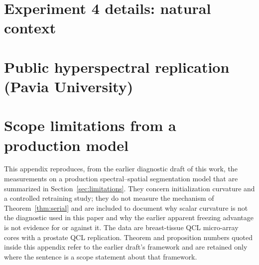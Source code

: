 \section{Experiment 4 details: natural context}
\label{app:exp4}

\section{Public hyperspectral replication (Pavia University)}
\label{app:pavia}

\section{Scope limitations from a production model}
\label{app:scope}

This appendix reproduces, from the earlier diagnostic draft of this work,
the measurements on a production spectral--spatial segmentation model that
are summarized in Section~\ref{sec:limitations}. They concern initialization
curvature and a controlled retraining study; they do not measure the
mechanism of Theorem~\ref{thm:serial} and are included to document why
scalar curvature is not the diagnostic used in this paper and why the
earlier apparent freezing advantage is not evidence for or against it. The
data are breast-tissue QCL micro-array cores with a prostate QCL replication.
Theorem and proposition numbers quoted inside this appendix refer to the
earlier draft's framework and are retained only where the sentence is a
scope statement about that framework.

\begingroup
\let\section\subsection
\let\subsection\subsubsection

\endgroup

